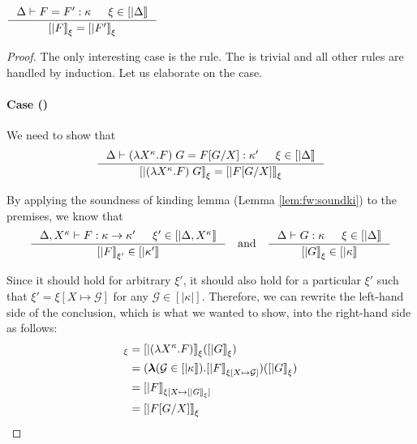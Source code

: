\begin{lemma} \label{lem:fw:soundtyeq}
$ \inference{\Delta |- F = F' : \kappa & \xi\in[|\Delta|]}
        {[|F|]_\xi = [|F'|]_\xi} $
\end{lemma}
\begin{proof}
The only interesting case is the  rule.
The  is trivial and all other rules are handled by induction.
Let us elaborate on the  case.

\paragraph{Case ()} We need to show that
\[ \inference
        { \Delta |- (\l X^\kappa.F)\;G = F[G/X] : \kappa' & \xi\in[|\Delta|] }
        { [| (\l X^\kappa.F)\;G |]_\xi = [| F[G/X] |]_\xi }
\]

By applying the soundness of kinding lemma (Lemma \ref{lem:fw:soundki})
to the premises, we know that
\[ \inference
        {\Delta,X^\kappa |- F : \kappa -> \kappa' & \xi'\in[|\Delta,X^\kappa|]}
        {[|F|]_{\xi'} \in [|\kappa'|]}
\quad\text{and}\quad
   \inference{\Delta |- G : \kappa & \xi\in[|\Delta|]}{[|G|]_\xi \in [|\kappa|]}
\]

Since it should hold for arbitrary $\xi'$, it should also hold for
a particular $\xi'$ such that $\xi'=\xi[X\mapsto\mathcal{G}]$
for any $\mathcal{G} \in [|\kappa|]$. Therefore, we can rewrite
the left-hand side of the conclusion, which is what we wanted to show,
into the right-hand side as follows:
\begin{align*}
[| (\l X^\kappa.F)\;G |]_\xi
&=[|(\l X^\kappa.F)|]_\xi ([|G|]_\xi) \\
&=(\bbl(\mathcal{G}\in[|\kappa|]).[|F|]_{\xi[X\mapsto\mathcal{G}]})([|G|]_\xi)\\
&=[|F|]_{\xi[X\mapsto[|G|]_\xi]} \\
&=[|F[G/X]|]_\xi
\end{align*}
\end{proof}

